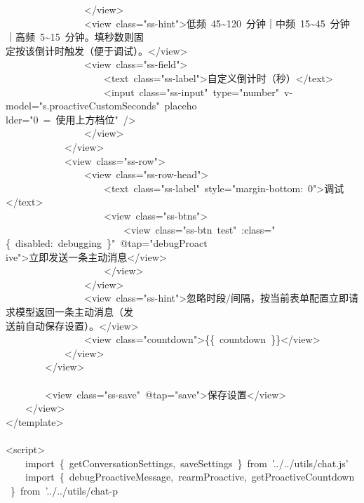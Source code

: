 \documentclass[a4paper,10pt]{article}
\begin{document}
{\ttfamily\footnotesize\raggedright
~~~~~~~~~~~~~~~~</view>\\
~~~~~~~~~~~~~~~~<view~class="ss-hint">低频~45\textasciitilde{}120~分钟｜中频~15\textasciitilde{}45~分钟｜高频~5\textasciitilde{}15~分钟。填秒数则固\\
定按该倒计时触发（便于调试）。</view>\\
~~~~~~~~~~~~~~~~<view~class="ss-field">\\
~~~~~~~~~~~~~~~~~~~~<text~class="ss-label">自定义倒计时（秒）</text>\\
~~~~~~~~~~~~~~~~~~~~<input~class="ss-input"~type="number"~v-model="s.proactiveCustomSeconds"~placeho\\
lder="0~=~使用上方档位"~/>\\
~~~~~~~~~~~~~~~~</view>\\
~~~~~~~~~~~~</view>\\
~~~~~~~~~~~~<view~class="ss-row">\\
~~~~~~~~~~~~~~~~<view~class="ss-row-head">\\
~~~~~~~~~~~~~~~~~~~~<text~class="ss-label"~style="margin-bottom:~0">调试</text>\\
~~~~~~~~~~~~~~~~~~~~<view~class="ss-btns">\\
~~~~~~~~~~~~~~~~~~~~~~~~<view~class="ss-btn~test"~:class="\{~disabled:~debugging~\}"~@tap="debugProact\\
ive">立即发送一条主动消息</view>\\
~~~~~~~~~~~~~~~~~~~~</view>\\
~~~~~~~~~~~~~~~~</view>\\
~~~~~~~~~~~~~~~~<view~class="ss-hint">忽略时段/间隔，按当前表单配置立即请求模型返回一条主动消息（发\\
送前自动保存设置）。</view>\\
~~~~~~~~~~~~~~~~<view~class="countdown">\{\{~countdown~\}\}</view>\\
~~~~~~~~~~~~</view>\\
~~~~~~~~</view>\\
\mbox{}\\
~~~~~~~~<view~class="ss-save"~@tap="save">保存设置</view>\\
~~~~</view>\\
</template>\\
\mbox{}\\
<script>\\
~~~~import~\{~getConversationSettings,~saveSettings~\}~from~'../../utils/chat.js'\\
~~~~import~\{~debugProactiveMessage,~rearmProactive,~getProactiveCountdown~\}~from~'../../utils/chat-p\\
}
\end{document}
